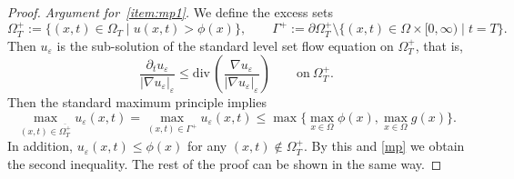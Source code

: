 \documentclass{amsart}
\theoremstyle{definition}
\newcommand{\divergence}{\mathrm{div}\,}
\begin{document}
\begin{proof}
  \emph{Argument for~\eqref{item:mp1}.} We define the excess sets
\[
\Omega _T ^+ :=\{(x,t) \in \Omega_T \mid
 u(x,t) > \phi (x) \},
 \qquad 
 \Gamma ^+ := \partial \Omega_ T ^+ \setminus 
 \{ (x,t) \in \Omega \times [0,\infty) \mid t=T \}.
\]
Then $u_\varepsilon$ is the sub-solution of the standard level set flow equation on $\Omega_ T ^+$, that is,
\[
\frac{\partial _ t u_\varepsilon}{|\nabla u_\varepsilon|_\varepsilon} \leq
\divergence \left( \frac{\nabla u_\varepsilon}{|\nabla u_\varepsilon|_\varepsilon} \right)
\qquad \text{on} \ \Omega _T ^+.
\]
Then the standard maximum principle implies
\begin{equation}\label{mp}
    \max _{(x,t) \in \overline{\Omega_T ^+}} u_\varepsilon (x,t)
=
\max_{(x,t) \in \Gamma ^+} u_\varepsilon (x,t)
\leq \max \{ \max_{x \in \Omega} \phi (x), \max_{x \in \Omega } g (x) \}.
\end{equation}
In addition, $u_\varepsilon (x,t) \leq \phi (x)$ for any $(x,t) \not \in \Omega _T ^+$. By this and \eqref{mp} we obtain the second inequality.
The rest of the proof can be shown in the same way.

\bigskip


\end{proof}
\end{document}
